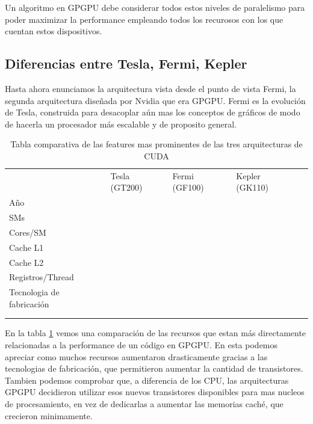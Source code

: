 Un algoritmo en GPGPU debe considerar todos estos niveles de paralelismo para poder maximizar la
performance empleando todos los recurosos con los que cuentan estos dispositivos.

\subsection{Diferencias entre Tesla, Fermi, Kepler}

Hasta ahora enunciamos la arquitectura vista desde el punto de vista Fermi, la segunda
arquitectura dise\~nada por Nvidia que era GPGPU. Fermi es la evoluci\'on de Tesla,
construida para desacoplar a\'un mas los conceptos de gr\'aficos de modo de hacerla
un procesador m\'as escalable y de proposito general.

\begin{table}[h]
\caption{Tabla comparativa de las features mas prominentes de las tres arquitecturas de CUDA}
\label{tab:CudaGenerations}
\begin{tabular}{lllll}
                 & Tesla (GT200) & Fermi (GF100) & Kepler (GK110) &  \\
A\~no            &               &               &                &  \\
SMs              &               &               &                &  \\
Cores/SM         &               &               &                &  \\
Cache L1         &               &               &                &  \\
Cache L2         &               &               &                &  \\
Registros/Thread &               &               &                &  \\
Tecnologia de fabricaci\'on &    &               &                &  \\
                 &               &               &                &  \\
                 &               &               &                &
\end{tabular}
\end{table}

En la tabla \ref{tab:CudaGenerations} vemos una comparaci\'on de las recursos que estan m\'as directamente
relacionadas a la performance de un c\'odigo en GPGPU. En esta podemos apreciar como muchos recursos
aumentaron drasticamente gracias a las tecnologias de fabricaci\'on, que permitieron aumentar la
cantidad de transistores. Tambien podemos comprobar que, a diferencia de los CPU, las arquitecturas GPGPU
decidieron utilizar esos nuevos transistores disponibles para mas nucleos de procesamiento, en vez
de dedicarlas a aumentar las memorias cach\'e, que crecieron minimamente.


